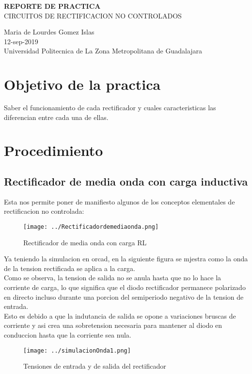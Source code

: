 \documentclass[11pt,a4paper]{article}
\begin{document}
\begin{center}
\textbf{REPORTE DE PRACTICA}\\
CIRCUITOS DE RECTIFICACION NO CONTROLADOS
\end{center}

\begin{center}
Maria de Lourdes Gomez Islas\\
12-sep-2019\\
Universidad Politecnica de La Zona Metropolitana de Guadalajara
\end{center}

\section{Objetivo de la practica}
Saber el funcionamiento de cada rectificador y cuales caracteristicas las diferencian entre cada una de ellas.

\section{Procedimiento}
\subsection{Rectificador de media onda con carga inductiva}
Esta nos permite poner de manifiesto algunos de los conceptos elementales de rectificacion no controlada:

\begin{figure}[h]
\centering
\texttt{[image: ../Rectificadordemediaonda.png]} 
\caption{Rectificador de media onda con carga RL}
\end{figure}

Ya teniendo la simulacion en orcad, en la siguiente figura se mjestra como la onda de la tension rectificada se aplica a la carga.\\
Como se observa, la tension de salida no se anula hasta que no lo hace la corriente de carga, lo que significa que el diodo rectificador permanece polarizado en directo incluso durante una porcion del semiperiodo negativo de la tension de entrada.\\
\newpage Esto es debido a que la indutancia de salida se opone a variaciones bruscas de corriente y asi crea una sobretension necesaria para mantener al diodo en conduccion hasta que la corriente sea nula.

\begin{figure}[h]
\centering
\texttt{[image: ../simulacionOnda1.png]} 
\caption{Tensiones de entrada y de salida del rectificador}
\end{figure}
\end{document}
